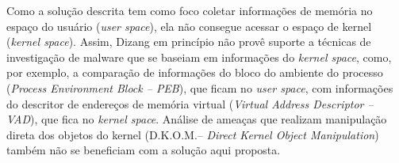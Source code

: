 \documentclass[conference]{IEEEtran}
\newcommand{\marcosT}[1]{{\color{red}{TODO: #1}}}
\newcommand{\fancyname}{Dizang }
\begin{document}
Como a solução descrita tem como foco coletar informações de memória no espaço do usuário (\textit{user space}), ela não consegue acessar o espaço de kernel (\textit{kernel space}). 
%
Assim, \fancyname em princípio não provê suporte a técnicas de investigação de malware que se baseiam em informações do \textit{kernel space}, como, por exemplo, a comparação de informações do bloco do ambiente do processo (\textit{Process Environment Block -- PEB}), que ficam no \textit{user space}, com informações do descritor de endereços de memória virtual (\textit{Virtual Address Descriptor -- VAD}), que fica no \textit{kernel space}. 
%
Análise de ameaças que realizam manipulação direta dos objetos do kernel (D.K.O.M.-- \textit{Direct Kernel Object Manipulation}) também não se beneficiam com a solução aqui proposta. 


%
%

\end{document}
